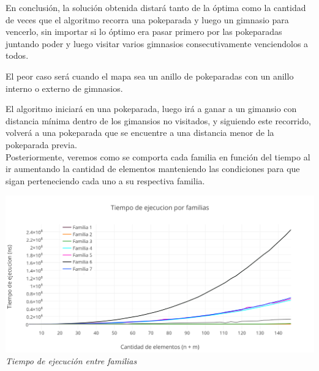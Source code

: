 En conclusi\'on, la soluci\'on obtenida distará tanto de la óptima como la cantidad de veces que el algoritmo recorra una pokeparada y luego un gimnasio para vencerlo, sin importar si lo óptimo era pasar primero por las pokeparadas juntando poder y luego visitar varios gimnasios consecutivamente venciendolos a todos.

El peor caso será cuando el mapa sea un anillo de pokeparadas con un anillo interno o externo de gimnasios.
 
El algoritmo iniciará en una pokeparada, luego irá a ganar a un gimansio con distancia mínima dentro de los gimansios no visitados, y siguiendo este recorrido, volverá a una pokeparada que se encuentre a una distancia menor de la pokeparada previa.\\

Posteriormente, veremos como se comporta cada familia en funci\'on del tiempo al ir aumentando la cantidad de elementos manteniendo las condiciones para que sigan perteneciendo cada uno a su respectiva familia.

\vspace*{0.3cm} \vspace*{0.3cm}
  \begin{center}
\includegraphics[scale=0.60]{./EJ2/comparativo.png}
\\{\textit{Tiempo de ejecución entre familias}}
  \end{center}
  \vspace*{0.3cm}
  \begin{figure} [!ht]
 \centering
    \label{fig:comparativo1}
    \label{fig:comparativo2}
    \end{figure}

